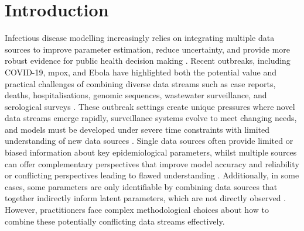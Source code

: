 \documentclass{article}
\begin{document}
\tableofcontents
\newpage

\section{Introduction}

Infectious disease modelling increasingly relies on integrating multiple data sources to improve parameter estimation, reduce uncertainty, and provide more robust evidence for public health decision making \citep{deangelis2018analysing}.
Recent outbreaks, including COVID-19, mpox, and Ebola have highlighted both the potential value and practical challenges of combining diverse data streams such as case reports, deaths, hospitalisations, genomic sequences, wastewater surveillance, and serological surveys \citep{knock2021key, ro2025estimating, Abbott2021-delta, Abbott2022-prevalence, Ward2024-sp,birrell2025real}.
These outbreak settings create unique pressures where novel data streams emerge rapidly, surveillance systems evolve to meet changing needs, and models must be developed under severe time constraints with limited understanding of new data sources \citep{mccaw2023role}.
Single data sources often provide limited or biased information about key epidemiological parameters, whilst multiple sources can offer complementary perspectives that improve model accuracy and reliability or conflicting perspectives leading to flawed understanding \citep{lison2024generative, sherratt2021exploring}.
Additionally, in some cases, some parameters are only identifiable by combining data sources that together indirectly inform latent parameters, which are not directly observed \citep{deangelis2018analysing}.
However, practitioners face complex methodological choices about how to combine these potentially conflicting data streams effectively.
\end{document}
